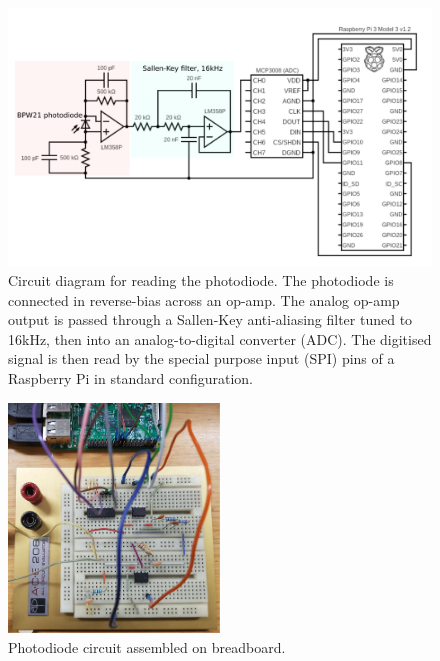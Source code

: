 \documentclass[paper-main.tex]{subfiles}
\begin{document}
\begin{figure}
	\includegraphics[width=.65\textwidth]{figures/circuit_diagram_2.pdf}
	\caption{\label{fig:circuit_diagram}
Circuit diagram for reading the photodiode. 
The photodiode is connected in reverse-bias across an op-amp. 
The analog op-amp output is passed through a Sallen-Key anti-aliasing filter tuned to 16kHz, then into an analog-to-digital converter (ADC). 
The digitised signal is then read by the special purpose input (SPI) pins of a Raspberry Pi in standard configuration.
}
\end{figure}


\begin{figure}%
	\includegraphics[width=0.5\textwidth]{figures/circuit_pic3.pdf}
	\caption{\label{fig:circuit_pic3}
Photodiode circuit assembled on breadboard.
}
\end{figure}




\end{document}

